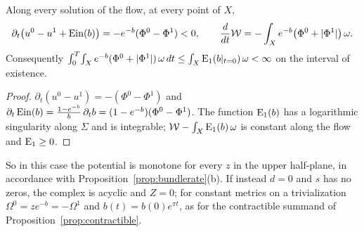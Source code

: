 \begin{proposition}\label{prop:section}
Along every solution of the flow, at every point of $X$,
\[
 \partial_t\bigl(u^0-u^1+\operatorname{Ein}(b)\bigr)=-e^{-b}(\Phi^0-\Phi^1)<0,
 \qquad\frac d{dt}\mathcal W=-\int_Xe^{-b}\bigl(\Phi^0+|\Phi^1|\bigr)\,\omega .
\]
Consequently
$\int_0^T\!\int_Xe^{-b}(\Phi^0+|\Phi^1|)\,\omega\,dt\leq\int_X\mathrm E_1(b|_{t=0})\,\omega<\infty$
on the interval of existence.
\end{proposition}

\begin{proof}
$\partial_t(u^0-u^1)=-(\Phi^0-\Phi^1)$ and
$\partial_t\operatorname{Ein}(b)=\frac{1-e^{-b}}b\,\partial_tb=(1-e^{-b})(\Phi^0-\Phi^1)$.
The function $\mathrm E_1(b)$ has a logarithmic singularity along $\Sigma$ and is
integrable; $\mathcal W-\int_X\mathrm E_1(b)\,\omega$ is constant along the flow and
$\mathrm E_1\geq0$.
\end{proof}

So in this case the potential is monotone for every $z$ in the upper
half-plane, in accordance with Proposition~\ref{prop:bundlerate}(b). If
instead $d=0$ and $s$ has no zeros, the complex is acyclic and $Z=0$; for
constant metrics on a trivialization $\Omega^0=ze^{-b}=-\Omega^1$ and
$b(t)=b(0)e^{\pi t}$, as for the contractible summand of
Proposition~\ref{prop:contractible}.
